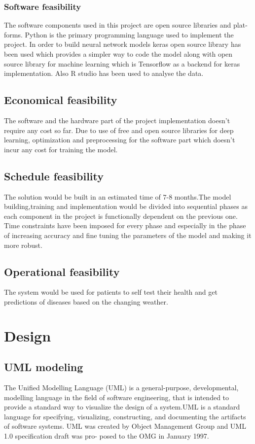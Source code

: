 \documentclass[12pt,a4paper]{report}
\begin{document}
\subsection{Software feasibility}
The software components used in this project are open source libraries and plat-
forms. Python is the primary programming language used to implement the project.
In order to build neural network models keras open source library has been used
which provides a simpler way to code the model along with open source library for
machine learning which is Tensorflow as a backend for keras implementation. Also
R studio has been used to analyse the data.
\section{Economical feasibility}
The software and the hardware part of the project implementation doesn't require
any cost so far. Due to use of free and open source libraries for deep learning, optimization and preprocessing for the software part which doesn't incur any cost for training the model.
\section{Schedule feasibility}
The solution would be built in an estimated time of 7-8 months.The model
building,training and implementation would be divided into sequential phases as each
component in the project is functionally dependent on the previous one. Time constraints have been imposed for every phase and especially in the phase of increasing
accuracy and fine tuning the parameters of the model and making it more robust.

\section{Operational feasibility}
The system would be used for patients to self test their health and get predictions of diseases based on the changing weather.
\newpage
\chapter{Design}
\newpage
\section{UML modeling}
The Unified Modelling Language (UML) is a general-purpose, developmental, modelling language in the field of software engineering, that is intended to provide a standard
way to visualize the design of a system.UML is a standard language for specifying,
visualizing, constructing, and documenting the artifacts of software systems. UML
was created by Object Management Group and UML 1.0 specification draft was pro-
posed to the OMG in January 1997.
\end{document}
